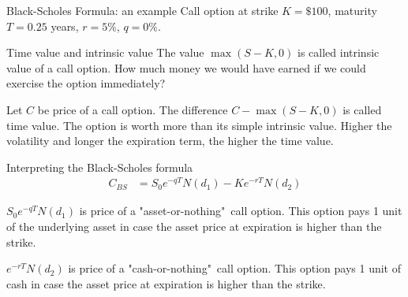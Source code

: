 \documentclass{beamer}
\begin{document}
\begin{frame}{Black-Scholes Formula: an example}
\justify
Call option at strike $K=\$100$, maturity $T=0.25$ years, $r=5\%$, $q=0\%$.

\centering
{}
\end{frame}



\begin{frame}{Time value and intrinsic value}
\justify
The value $\max(S - K, 0)$ is called \alert{intrinsic value} of a call option. How much money we would have earned if we could exercise the option immediately?

\justify
Let $C$ be price of a call option. The difference $C - \max(S - K, 0)$ is called \alert{time value}. The option is worth more than its simple intrinsic value. Higher the volatility and longer the expiration term, the higher the time value.
\end{frame}



\begin{frame}{Interpreting the Black-Scholes formula}
\begin{align*}
C_{BS} &= S_0e^{-qT}N(d_1) - Ke^{-rT}N(d_2)
\end{align*}

\justify
$S_0e^{-qT}N(d_1)$ is price of a "asset-or-nothing"\ call option. This option pays 1 unit of the underlying asset in case the asset price at expiration is higher than the strike.

\justify
$e^{-rT}N(d_2)$ is price of a "cash-or-nothing"\ call option. This option pays 1 unit of cash in case the asset price at expiration is higher than the strike.
\end{frame}
\end{document}
